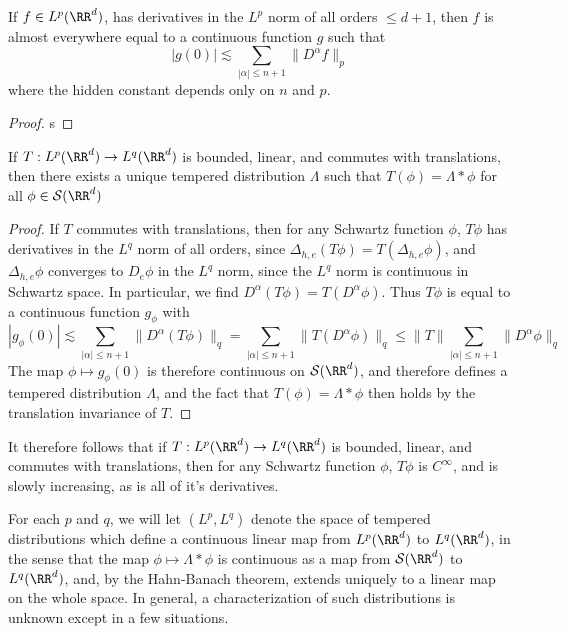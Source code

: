 \begin{lemma}
	If $f \in L^p(\RR^d)$, has derivatives in the $L^p$ norm of all orders $\leq d+1$, then $f$ is almost everywhere equal to a continuous function $g$ such that
	\[ |g(0)| \lesssim \sum_{|\alpha| \leq n + 1} \| D^\alpha f \|_p \]
	where the hidden constant depends only on $n$ and $p$.
\end{lemma}
\begin{proof}
	s
\end{proof}

\begin{theorem}
	If $T: L^p(\RR^d) \to L^q(\RR^d)$ is bounded, linear, and commutes with translations, then there exists a unique tempered distribution $\Lambda$ such that $T(\phi) = \Lambda * \phi$ for all $\phi \in \mathcal{S}(\RR^d)$
\end{theorem}
\begin{proof}
	If $T$ commutes with translations, then for any Schwartz function $\phi$, $T\phi$ has derivatives in the $L^q$ norm of all orders, since $\Delta_{h,e}(T \phi) = T(\Delta_{h,e} \phi)$, and $\Delta_{h,e} \phi$ converges to $D_e \phi$ in the $L^q$ norm, since the $L^q$ norm is continuous in Schwartz space. In particular, we find $D^\alpha (T\phi) = T(D^\alpha \phi)$. Thus $T\phi$ is equal to a continuous function $g_\phi$ with
	\[ |g_\phi(0)| \lesssim \sum_{|\alpha| \leq n+1} \| D^\alpha(T\phi) \|_q = \sum_{|\alpha| \leq n+1} \| T(D^\alpha \phi) \|_q \leq \| T \| \sum_{|\alpha| \leq n+1} \| D^\alpha \phi \|_q \]
	The map $\phi \mapsto g_\phi(0)$ is therefore continuous on $\mathcal{S}(\RR^d)$, and therefore defines a tempered distribution $\Lambda$, and the fact that $T(\phi) = \Lambda * \phi$ then holds by the translation invariance of $T$.
\end{proof}

\begin{remark}
	It therefore follows that if $T: L^p(\RR^d) \to L^q(\RR^d)$ is bounded, linear, and commutes with translations, then for any Schwartz function $\phi$, $T\phi$ is $C^\infty$, and is slowly increasing, as is all of it's derivatives.
\end{remark}

For each $p$ and $q$, we will let $(L^p,L^q)$ denote the space of tempered distributions which define a continuous linear map from $L^p(\RR^d)$ to $L^q(\RR^d)$, in the sense that the map $\phi \mapsto \Lambda * \phi$ is continuous as a map from $\mathcal{S}(\RR^d)$ to $L^q(\RR^d)$, and, by the Hahn-Banach theorem, extends uniquely to a linear map on the whole space. In general, a characterization of such distributions is unknown except in a few situations.

